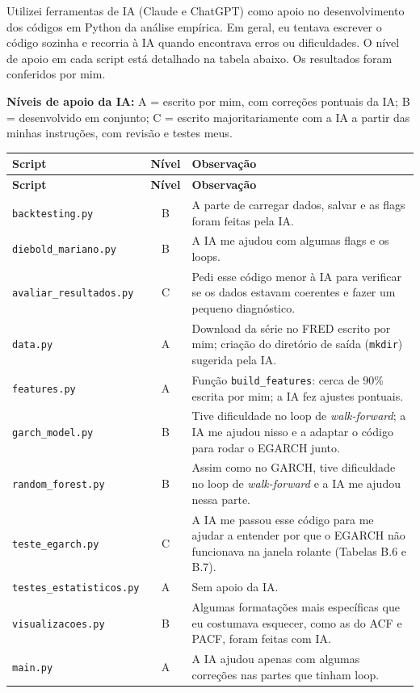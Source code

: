 \begin{singlespace}
\noindent Utilizei ferramentas de IA (Claude e ChatGPT) como apoio no
desenvolvimento dos códigos em Python da análise empírica. Em geral, eu
tentava escrever o código sozinha e recorria à IA quando encontrava erros ou
dificuldades. O nível de apoio em cada script está detalhado na tabela
abaixo. Os resultados foram conferidos por mim.
\par\vspace{0.4\baselineskip}

\noindent\textbf{Níveis de apoio da IA:} A = escrito por mim, com correções
pontuais da IA; B = desenvolvido em conjunto; C = escrito majoritariamente
com a IA a partir das minhas instruções, com revisão e testes meus.
\par\vspace{0.4\baselineskip}

\noindent\begin{longtable}{|p{5.4cm}|c|p{8.2cm}|}
\hline
\textbf{Script} & \textbf{Nível} & \textbf{Observação} \\ \hline
\endfirsthead
\hline
\textbf{Script} & \textbf{Nível} & \textbf{Observação} \\ \hline
\endhead
\texttt{backtesting.py}          & B & A parte de carregar dados, salvar e as flags foram feitas pela IA. \\ \hline
\texttt{diebold\_mariano.py}     & B & A IA me ajudou com algumas flags e os loops. \\ \hline
\texttt{avaliar\_resultados.py}  & C & Pedi esse código menor à IA para verificar se os dados estavam coerentes e fazer um pequeno diagnóstico. \\ \hline
\texttt{data.py}                 & A & Download da série no FRED escrito por mim; criação do diretório de saída (\texttt{mkdir}) sugerida pela IA. \\ \hline
\texttt{features.py}             & A & Função \texttt{build\_features}: cerca de 90\% escrita por mim; a IA fez ajustes pontuais. \\ \hline
\texttt{garch\_model.py}         & B & Tive dificuldade no loop de \textit{walk-forward}; a IA me ajudou nisso e a adaptar o código para rodar o EGARCH junto. \\ \hline
\texttt{random\_forest.py}       & B & Assim como no GARCH, tive dificuldade no loop de \textit{walk-forward} e a IA me ajudou nessa parte. \\ \hline
\texttt{teste\_egarch.py}        & C & A IA me passou esse código para me ajudar a entender por que o EGARCH não funcionava na janela rolante (Tabelas B.6 e B.7). \\ \hline
\texttt{testes\_estatisticos.py} & A & Sem apoio da IA. \\ \hline
\texttt{visualizacoes.py}        & B & Algumas formatações mais específicas que eu costumava esquecer, como as do ACF e PACF, foram feitas com IA. \\ \hline
\texttt{main.py}                 & A & A IA ajudou apenas com algumas correções nas partes que tinham loop. \\ \hline
\end{longtable}



\end{singlespace}
